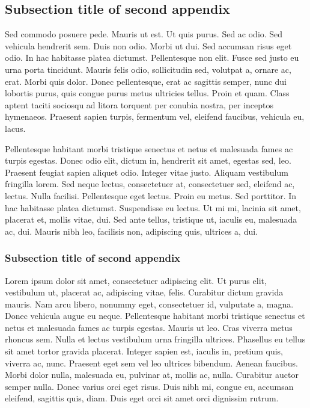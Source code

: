\documentclass[APA,LATO1COL]{WileyNJD-v2}
\begin{document}
\subsection{Subsection title of second appendix\label{app2.1a}}

Sed commodo posuere pede. Mauris ut est. Ut quis purus. Sed ac odio. Sed vehicula hendrerit sem. Duis non odio.
Morbi ut dui. Sed accumsan risus eget odio. In hac habitasse platea dictumst. Pellentesque non elit. Fusce sed justo
eu urna porta tincidunt. Mauris felis odio, sollicitudin sed, volutpat a, ornare ac, erat. Morbi quis dolor. Donec
pellentesque, erat ac sagittis semper, nunc dui lobortis purus, quis congue purus metus ultricies tellus. Proin et quam.
Class aptent taciti sociosqu ad litora torquent per conubia nostra, per inceptos hymenaeos. Praesent sapien turpis,
fermentum vel, eleifend faucibus, vehicula eu, lacus.

Pellentesque habitant morbi tristique senectus et netus et malesuada fames ac turpis egestas. Donec odio elit,
dictum in, hendrerit sit amet, egestas sed, leo. Praesent feugiat sapien aliquet odio. Integer vitae justo. Aliquam
vestibulum fringilla lorem. Sed neque lectus, consectetuer at, consectetuer sed, eleifend ac, lectus. Nulla facilisi.
Pellentesque eget lectus. Proin eu metus. Sed porttitor. In hac habitasse platea dictumst. Suspendisse eu lectus. Ut
mi mi, lacinia sit amet, placerat et, mollis vitae, dui. Sed ante tellus, tristique ut, iaculis eu, malesuada ac, dui.
Mauris nibh leo, facilisis non, adipiscing quis, ultrices a, dui.

\subsubsection{Subsection title of second appendix\label{app2.1.1a}}

Lorem ipsum dolor sit amet, consectetuer adipiscing elit. Ut purus elit, vestibulum ut, placerat ac, adipiscing vitae,
felis. Curabitur dictum gravida mauris. Nam arcu libero, nonummy eget, consectetuer id, vulputate a, magna. Donec
vehicula augue eu neque. Pellentesque habitant morbi tristique senectus et netus et malesuada fames ac turpis egestas.
Mauris ut leo. Cras viverra metus rhoncus sem. Nulla et lectus vestibulum urna fringilla ultrices. Phasellus eu tellus
sit amet tortor gravida placerat. Integer sapien est, iaculis in, pretium quis, viverra ac, nunc. Praesent eget sem vel
leo ultrices bibendum. Aenean faucibus. Morbi dolor nulla, malesuada eu, pulvinar at, mollis ac, nulla. Curabitur
auctor semper nulla. Donec varius orci eget risus. Duis nibh mi, congue eu, accumsan eleifend, sagittis quis, diam.
Duis eget orci sit amet orci dignissim rutrum.
\end{document}
